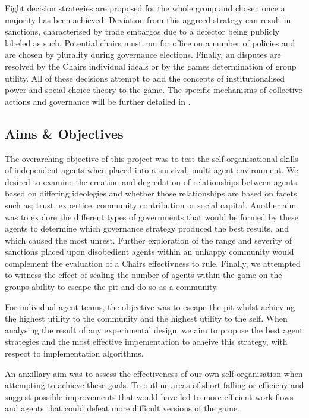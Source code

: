 Fight decision strategies are proposed for the whole group and chosen once a majority has been achieved. Deviation from this aggreed strategy can result in sanctions, characterised by trade embargos due to a defector being publicly labeled as such. Potential chairs must run for office on a number of policies and are chosen by plurality during governance elections. Finally, an disputes are resolved by the Chairs individual ideals or by the games determination of group utility. All of these decisions attempt to add the concepts of institutionalised power and social choice theory to the game. The specific mechanisms of collective actions and governance will be further detailed in . 


\subsection{Aims \& Objectives}\label{sec:aims}

The overarching objective of this project was to test the self-organisational skills of independent agents when placed into a survival, multi-agent environment. We desired to examine the creation and degredation of relationships between agents based on differing ideolegies and whether those relationships are based on facets such as; trust, expertice, community contribution or social capital. Another aim was to explore the different types of governments that would be formed by these agents to determine which governance strategy produced the best results, and which caused the most unrest. Further exploration of the range and severity of sanctions placed upon disobedient agents within an unhappy community would complement the evaluation of a Chairs effectivness to rule. Finally, we attempted to witness the effect of scaling the number of agents within the game on the groups ability to escape the pit and do so as a community. 

For individual agent teams, the objective was to escape the pit whilst achieving the highest utility to the community and the highest utility to the self. When analysing the result of any experimental design, we aim to propose the best agent strategies and the most effective impementation to acheive this strategy, with respect to implementation algorithms. 

An anxillary aim was to assess the effectiveness of our own self-organisation when attempting to achieve these goals. To outline areas of short falling or efficieny and suggest possible improvements that would have led to more efficient work-flows and agents that could defeat more difficult versions of the game. 

